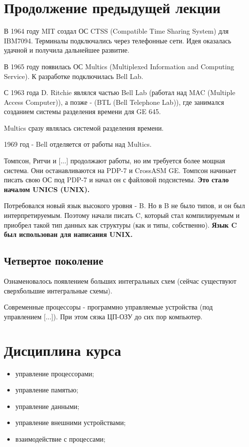 \documentclass[14pt, a4paper]{article}
\begin{document}
	
	\section*{Продолжение предыдущей лекции}
	
	В 1964 году MIT создал ОС CTSS (Compatible Time Sharing System) для IBM7094. Терминалы подключались через телефонные сети. Идея оказалась удачной и получила дальнейшее развитие.
	
	В 1965 году появилась ОС Multics (Multiplexed Information and Computing Service). К разработке подключилась Bell Lab.
	
	С 1963 года D. Ritchie являлся частью Bell Lab (работал над MAC (Multiple Access Computer)), а позже - (BTL (Bell Telephone Lab)), где занимался созданием системы разделения времени для GE 645.
	
	Multics сразу являлась системой разделения времени.
	
	1969 год - Bell отделяется от работы над Multics.
	
	Томпсон, Ритчи и [...] продолжают работы, но им требуется более мощная система. Они останавливаются на PDP-7 и CrossASM GE. Томпсон начинает писать свою ОС под PDP-7 и начал он с файловой подсистемы. {\bf Это стало началом UNICS (UNIX).}
	
	Потребовался новый язык высокого уровня - B. Но в B не было типов, и он был интерпретируемым. Поэтому начали писать C, который стал компилируемым и приобрел такой тип данных как структуры (как и типы, собственно). {\bf Язык C был использован для написания UNIX.}
	
	\subsection*{Четвертое поколение}
	
	Ознаменовалось появлением больших интегральных схем (сейчас существуют сверхбольшие интегральные схемы).
	
	Современные процессоры - программно управляемые устройства (под управлением [...]). При этом сязка ЦП-ОЗУ до сих пор компьютер.
	
	\section*{Дисциплина курса}
	
	\begin{itemize}
		\item управление процессорами;
		
		\item управление памятью;
		
		\item управление данными;
		
		\item управление внешними устройствами;
		
		\item взаимодействие с процессами;
	\end{itemize}
\end{document}
